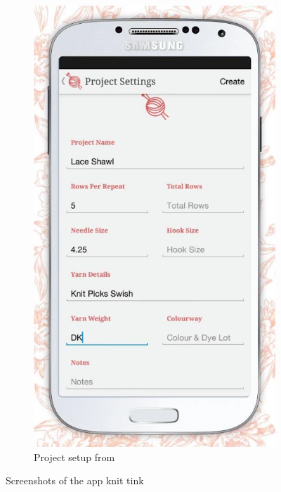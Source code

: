 \begin{figure}[H]
\begin{subfigure}[b]{0.33\textwidth}
      \centering
        \includegraphics[width=0.95\linewidth]{images/image11.png}
        \caption[
            Project setup 
        ]{Project setup from \protect\cite{knittink_project_setup}}
      \label{fig:knit_tink_project_setup}
    \end{subfigure}
  \caption[Screenshots of the app knit tink ]{Screenshots of the app knit tink}
\end{figure}

